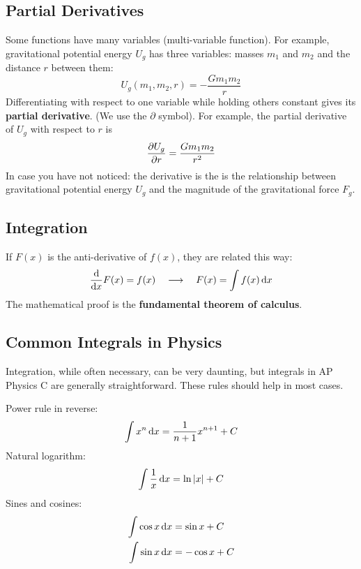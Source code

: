 \documentclass{../../oss-handout}
\begin{document}
\subsection{Partial Derivatives}
Some functions have many variables (multi-variable function). For example,
gravitational potential energy $U_g$ has three variables: masses $m_1$ and
$m_2$ and the distance $r$ between them:
\begin{equation*}
    U_g(m_1,m_2,r)=-\frac{Gm_1m_2}{r}
\end{equation*}
Differentiating with respect to one variable while holding others constant
gives its \textbf{partial derivative}. (We use the $\partial$ symbol). For
example, the partial derivative of $U_g$ with respect to $r$ is
\begin{equation*}
    \diffp{U_g}{r}=\frac{Gm_1m_2}{r^2}
\end{equation*}
In case you have not noticed: the derivative is the is the relationship between
gravitational potential energy $U_g$ and the magnitude of the gravitational
force $F_g$.


\subsection{Integration}

If $F(x)$ is the anti-derivative of $f(x)$, they are related this way:
\begin{equation*}
  \diff{}xF(x)=f(x)\quad\longrightarrow\quad F(x)=\int f(x)\dl x
\end{equation*}
The mathematical proof is the \textbf{fundamental theorem of calculus}.


\subsection{Common Integrals in Physics}
Integration, while often necessary, can be very daunting, but integrals in AP
Physics C  are generally straightforward. These rules should help in most cases.

Power rule in reverse:
\begin{equation*}
  \int x^n\dl x=\frac1{n+1}x^{n+1}+C
\end{equation*}
Natural logarithm:
\begin{equation*}
  \int \frac1x\dl x =\ln |x|+C 
\end{equation*}
Sines and cosines:
\begin{align*}
  \int\cos x\dl x&=\sin x+C\\
  \int\sin x\dl x&=-\cos x+C
\end{align*}
\end{document}
